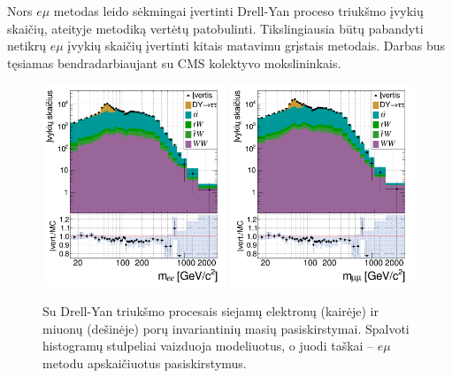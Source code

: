 \documentclass[a4paper, 12pt, twoside]{article}
\newcommand{\emu}{e\mu}
\begin{document}
Nors $\emu$ metodas leido sėkmingai įvertinti Drell-Yan proceso triukšmo įvykių skaičių, ateityje metodiką
vertėtų patobulinti.
Tikslingiausia būtų pabandyti netikrų $\emu$ įvykių skaičių įvertinti kitais matavimu grįstais metodais.
Darbas bus tęsiamas bendradarbiaujant su CMS kolektyvo mokslininkais.

\begin{figure}[H]
	\includegraphics[width=0.49\textwidth]{ee_bkg_est.png}
	\includegraphics[width=0.49\textwidth]{mumu_bkg_est.png}
	\caption{\label{fig:bkgEst}
		Su Drell-Yan triukšmo procesais siejamų elektronų (kairėje) ir miuonų (dešinėje) porų invariantinių masių pasiskirstymai.
		Spalvoti histogramų stulpeliai vaizduoja modeliuotus, o juodi taškai -- $\emu$ metodu apskaičiuotus pasiskirstymus.}
\end{figure}
\end{document}
